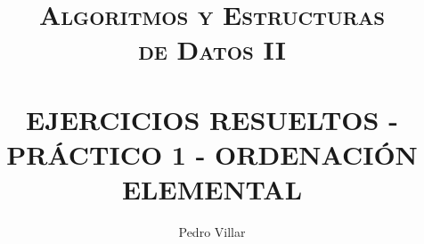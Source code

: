 \documentclass{article}
\title{ \normalsize \textsc{Algoritmos y Estructuras\\
de Datos II}
		\\ [2.0cm]
		\HRule \\
		\LARGE \textbf{\uppercase{Ejercicios Resueltos - Práctico 1 - Ordenación Elemental}}
		\HRule \\ [0.5cm]
		\normalsize  \vspace*{5\baselineskip}}
\date{}
\author{Pedro Villar}
\begin{document}
\newcommand{\HRule}{\rule{\linewidth}{0.5pt}} %
\maketitle
\newpage
\end{document}
